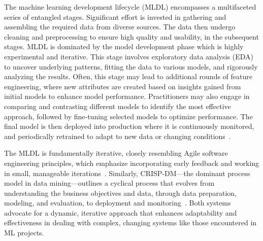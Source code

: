 The machine learning development lifecycle (MLDL) encompasses a multifaceted series of entangled stages. Significant effort is invested in gathering and assembling the required data from diverse sources. The data then undergo cleaning and preprocessing to ensure high quality and usability, in the subsequent stages. MLDL is dominated by the model development phase which is highly experimental and iterative. This stage involves exploratory data analysis (EDA) to uncover underlying patterns, fitting the data to various models, and rigorously analyzing the results. Often, this stage may lead to additional rounds of feature engineering, where new attributes are created based on insights gained from initial models to enhance model performance. Practitioners may also engage in comparing and contrasting different models to identify the most effective approach, followed by fine-tuning selected models to optimize performance. The final model is then deployed into production where it is continuously monitored, and periodically retrained to adapt to new data or changing conditions~\cite{haakman2021ai,amershi2019software,sculley2015hidden}.


The MLDL is fundamentally iterative, closely resembling Agile software engineering principles, which emphasize incorporating early feedback and working in small, manageable iterations~\cite{betz2018managing}. Similarly, CRISP-DM---the dominant process model in data mining---outlines a cyclical process that evolves from understanding the business objectives and data, through data preparation, modeling, and evaluation, to deployment and monitoring~\cite{martinez-plumed2021crisp-dm}. Both systems advocate for a dynamic, iterative approach that enhances adaptability and effectiveness in dealing with complex, changing systems like those encountered in ML projects.


